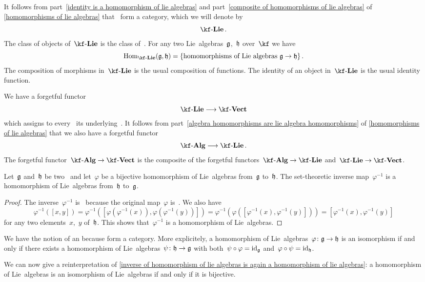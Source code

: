 \begin{remark}
  It follows from part~\ref{identity is a homomorphism of lie algebras} and part~\ref{composite of homomorphisms of lie algebras} of \cref{homomorphisms of lie algebras} that~\liealgebras{$\kf$} form a category, which we will denote by
  \[
    \cLie{\kf} \,.
  \]
  The class of objects of~$\cLie{\kf}$ is the class of~\liealgebras{$\kf$}.
  For any two Lie~algebras~$\mathfrak{g}$,~$\mathfrak{h}$ over~$\kf$ we have
  \[
    \Hom_{\cLie{\kf}}(\glie, \hlie)
    =
    \{
      \text{homomorphisms of Lie algebras~$\textstyle \glie \to \hlie$} 
    \} \,.
  \]
  The composition of morphisms in~$\cLie{\kf}$ is the usual composition of functions.
  The identity of an object in~$\cLie{\kf}$ is the usual identity function.

  We have a forgetful functor
  \[
    \cLie{\kf}
    \to
    \cVect{\kf}
  \]
  which assigns to every~\liealgebra{$\kf$} its underlying~\vectorspace{$\kf$}.
  It follows from part~\ref{algebra homomorphisms are lie algebra homomorphisms} of \cref{homomorphisms of lie algebras} that we also have a forgetful functor
  \[
    \cAlg{\kf}
    \to
    \cLie{\kf} \,.
  \]
  The forgetful functor~$\cAlg{\kf} \to \cVect{\kf}$ is the composite of the forgetful functors~$\cAlg{\kf} \to \cLie{\kf}$ and~$\cLie{\kf} \to \cVect{\kf}$.
\end{remark}


\begin{proposition}
  \label{inverse of homomorphism of lie algebras is again a homomorphism of lie algebras}
  Let~$\mathfrak{g}$ and~$\mathfrak{h}$ be two~\liealgebras{$\kf$} and let~$\varphi$ be a bijective homomorphism of Lie~algebras from~$\mathfrak{g}$ to~$\mathfrak{h}$.
  The set-theoretic inverse map~$\varphi^{-1}$ is a homomorphism of Lie~algebras from~$\mathfrak{h}$ to~$\mathfrak{g}$.
\end{proposition}


\begin{proof}
  The inverse~$\varphi^{-1}$ is~\linear{$\kf$} because the original map~$\varphi$ is~\linear{$\kf$}.
  We also have
  \[
    \varphi^{-1}( [x,y] )
    =
    \varphi^{-1}( [ \varphi(\varphi^{-1}(x)), \varphi(\varphi^{-1}(y)) ] )
    =
    \varphi^{-1}( \varphi( [ \varphi^{-1}(x), \varphi^{-1}(y) ] ) )
    =
    [ \varphi^{-1}(x), \varphi^{-1}(y) ]
  \]
  for any two elements~$x$,~$y$ of~$\mathfrak{h}$.
  This shows that~$\varphi^{-1}$ is a homomorphism of Lie~algebras.
\end{proof}


\begin{remark}
  We have the notion of an  because \liealgebras{$\kf$} form a category.
  More explicitely, a homomorphism of Lie~algebras~$\varphi \colon \glie \to \hlie$ is an isomorphism if and only if there exists a homomorphism of Lie~algebras~$\psi \colon \hlie \to \glie$ with both~$\psi \circ \varphi = \mathrm{id}_{\mathfrak{g}}$ and~$\varphi \circ \psi = \mathrm{id}_{\mathfrak{h}}$.

  We can now give a reinterpretation of \cref{inverse of homomorphism of lie algebras is again a homomorphism of lie algebras}:
  a homomorphism of Lie~algebras is an isomorphism of Lie~algebras if and only if it is bijective.
\end{remark}


